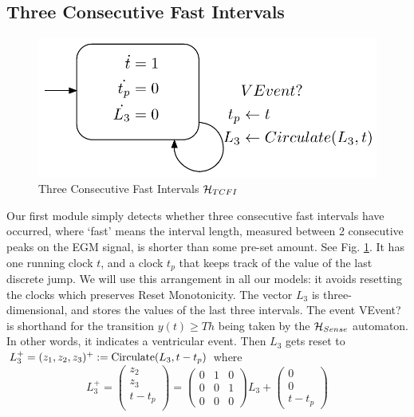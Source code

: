 \subsection{Three Consecutive Fast Intervals}
\label{sec:tcfi}
\begin{figure}[t]
	\centering
	\includegraphics[scale=0.3]{figures/TCFI}
		\vspace{-10pt}
	\caption{Three Consecutive Fast Intervals $\mathcal{H}_{TCFI}$}
	\label{fig:tcfi}
\end{figure}
Our first module simply detects whether three consecutive fast intervals have occurred, where `fast' means the interval length, measured between 2 consecutive peaks on the \ac{EGM} signal, is shorter than some pre-set amount.
See Fig. \ref{fig:tcfi}.
It has one running clock $t$, and a clock $t_{p}$ that keeps track of the value of the last discrete jump. 
We will use this arrangement in all our models: it avoids resetting the clocks which preserves Reset Monotonicity.
The vector $L_3$ is three-dimensional, and stores the values of the last three intervals.
The event VEvent? is shorthand for the transition $y(t) \geq Th$ being taken by the $\mathcal{H}_{Sense}$ automaton.
In other words, it indicates a ventricular event.
Then $L_3$ gets reset to $L_3^+ = (z_1,z_2,z_3)^+ := \text{Circulate}(L_3,t-t_p)$ where
\begin{equation}
L_3^+ = 
\left(\begin{matrix}
z_2\\z_3\\t-t_{p}\\
\end{matrix}
\right)
=
\left(\begin{matrix}
0 & 1 & 0\\0& 0& 1\\0& 0 &0
\end{matrix}
\right) L_3 + 
\left(\begin{matrix}
0\\0\\t-t_p
\end{matrix}
\right)
\end{equation}
